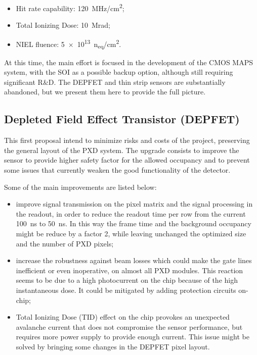 \begin{itemize}
\item Hit rate capability: \SI{120}{MHz/cm^{2}};
\item Total Ionizing Dose: \SI{10}{Mrad};
\item NIEL fluence: \SI{5e13}{n_{eq}/cm^{2}}.
\end{itemize}

At this time, the main effort is focused in the development of the CMOS MAPS system, with the SOI as a possible backup option, although still requiring significant R\&D. The DEPFET and thin strip sensors are substantially abandoned, but we present them here to provide the full picture.


\subsection{Depleted Field Effect Transistor (DEPFET)}

This first proposal intend to minimize risks and costs of the project, preserving the general layout of the PXD system. The upgrade consists to improve the sensor to provide higher safety factor for the allowed occupancy and to prevent some issues that currently weaken the good functionality of the detector.

Some of the main improvements are listed below:

\begin{itemize}
\item improve signal transmission on the pixel matrix and the signal processing in the readout, in order to reduce the readout time per row from the current \SI{100}{ns} to \SI{50}{ns}. In this way the frame time and the background occupancy might be reduce by a factor 2, while leaving unchanged the optimized size and the number of PXD pixels;
\item increase the robustness against beam losses which could make the gate lines inefficient or even inoperative, on almost all PXD modules. This reaction seems to be due to a high photocurrent on the chip because of the high instantaneous dose. It could be mitigated by adding protection circuits on-chip;
\item Total Ionizing Dose (TID) effect on the chip provokes an unexpected avalanche current that does not compromise the sensor performance, but requires more power supply to provide enough current. This issue might be solved by bringing some changes in the DEPFET pixel layout.
\end{itemize}

